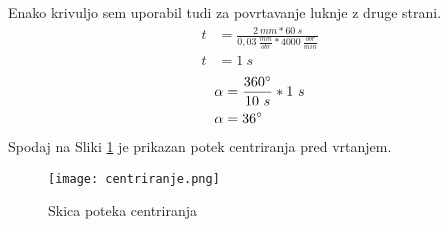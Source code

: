 Enako krivuljo sem uporabil tudi za povrtavanje luknje z druge strani.
\begin{equation*}
	\begin{split}
		t &= \frac{2\ mm*60\ s}{0,03\ \frac{mm}{obr}*4000\ \frac{obr}{min}} \\
		t &= 1\ s
	\end{split}
\end{equation*}
\begin{equation*}
	\begin{split}
		\alpha &= \frac{360\degree}{10\ s} * 1\  s\\
		\alpha &= 36\degree
	\end{split}
\end{equation*}
Spodaj na Sliki \ref{centriranje} je prikazan potek
centriranja pred vrtanjem.
\begin{figure}[H]
	\begin{center}
		\texttt{[image: centriranje.png]}
		\caption{Skica poteka centriranja
			\cite{lasten}}
		\label{centriranje}
	\end{center}
\end{figure}

